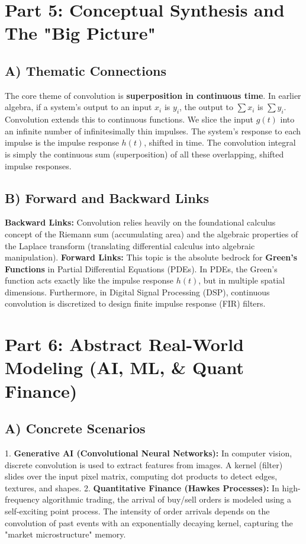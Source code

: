 \documentclass[11pt, letterpaper]{article}
\theoremstyle{definition}
\theoremstyle{remark}
\begin{document}
\newpage
\section{Part 5: Conceptual Synthesis and The "Big Picture"}

\subsection{A) Thematic Connections}
The core theme of convolution is \textbf{superposition in continuous time}. In earlier algebra, if a system's output to an input $x_i$ is $y_i$, the output to $\sum x_i$ is $\sum y_i$. Convolution extends this to continuous functions. We slice the input $g(t)$ into an infinite number of infinitesimally thin impulses. The system's response to each impulse is the impulse response $h(t)$, shifted in time. The convolution integral is simply the continuous sum (superposition) of all these overlapping, shifted impulse responses.

\subsection{B) Forward and Backward Links}
\textbf{Backward Links:} Convolution relies heavily on the foundational calculus concept of the Riemann sum (accumulating area) and the algebraic properties of the Laplace transform (translating differential calculus into algebraic manipulation).
\textbf{Forward Links:} This topic is the absolute bedrock for \textbf{Green's Functions} in Partial Differential Equations (PDEs). In PDEs, the Green's function acts exactly like the impulse response $h(t)$, but in multiple spatial dimensions. Furthermore, in Digital Signal Processing (DSP), continuous convolution is discretized to design finite impulse response (FIR) filters.

\section{Part 6: Abstract Real-World Modeling (AI, ML, \& Quant Finance)}

\subsection{A) Concrete Scenarios}
1. \textbf{Generative AI (Convolutional Neural Networks):} In computer vision, discrete convolution is used to extract features from images. A kernel (filter) slides over the input pixel matrix, computing dot products to detect edges, textures, and shapes.
2. \textbf{Quantitative Finance (Hawkes Processes):} In high-frequency algorithmic trading, the arrival of buy/sell orders is modeled using a self-exciting point process. The intensity of order arrivals depends on the convolution of past events with an exponentially decaying kernel, capturing the "market microstructure" memory.
\end{document}
